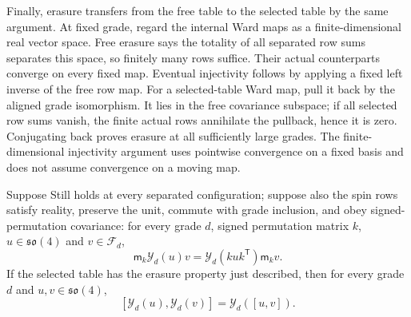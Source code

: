 Finally, erasure transfers from the free table to the selected table by
the same argument.  At fixed grade, regard the internal Ward maps as a
finite-dimensional real vector space.  Free erasure says the totality of
all separated row sums separates this space, so finitely many rows suffice.
Their actual counterparts converge on every fixed map.  Eventual
injectivity follows by applying a fixed left inverse of the free row map.
For a selected-table Ward map, pull it back by the aligned grade
isomorphism.  It lies in the free covariance subspace; if all selected row
sums vanish, the finite actual rows annihilate the pullback, hence it is
zero.  Conjugating back proves erasure at all sufficiently large grades.
The finite-dimensional injectivity argument uses pointwise convergence on
a fixed basis and does not assume convergence on a moving map.

\begin{lemma}
\label{lem:ward-brackets}
Suppose Still holds at every separated configuration; suppose also the
spin rows satisfy reality, preserve the unit, commute with grade inclusion,
and obey signed-permutation covariance: for every grade $d$, signed
permutation matrix $k$, $u\in\mathfrak{so}(4)$ and $v\in\mathcal F_d$,
\[
 \mathsf m_k\mathcal Y_d(u)v
   =\mathcal Y_d(kuk^{\mathsf T})\mathsf m_kv.
\]  If the selected table has the erasure
property just described, then for every grade $d$ and $u,v\in\mathfrak{so}(4)$,
\[
 [\mathcal Y_d(u),\mathcal Y_d(v)] = \mathcal Y_d([u,v]).
\]
\end{lemma}

